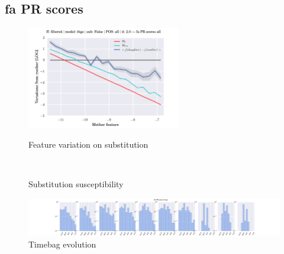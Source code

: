 \subsection{fa PR scores}
\begin{figure}[h!]
    \centering
    \includegraphics[width=0.6\textwidth]{images/feature-cards/fa_PR_scores/feature_variations.png}
    \caption{Feature variation on substitution}
	~
	\caption{Substitution susceptibility}
    \includegraphics[width=\textwidth]{images/feature-cards/fa_PR_scores/timebags_evolution-hist.png}
	\caption{Timebag evolution}
\end{figure}


\clearpage
